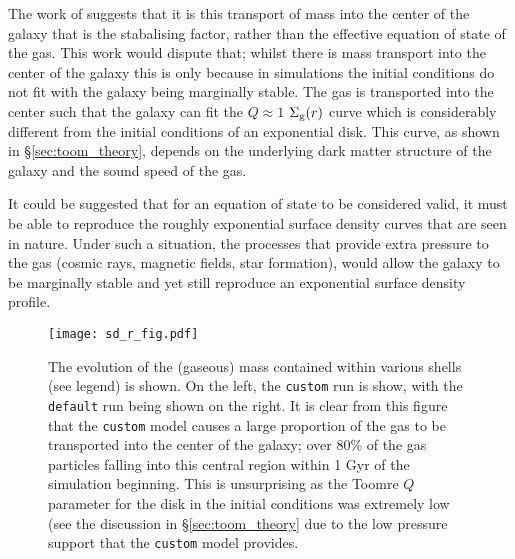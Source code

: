 The work of \citet{krumholz_is_2016} suggests that it is this transport of mass into the center of the galaxy that is the stabalising factor, rather than the effective equation of state of the gas.
This work would dispute that; whilst there is mass transport into the center of the galaxy this is only because in simulations the initial conditions do not fit with the galaxy being marginally stable.
The gas is transported into the center such that the galaxy can fit the $Q\approx1$ $\Sigma_\mathrm{g}(r)$ curve which is considerably different from the initial conditions of an exponential disk.
This curve, as shown in \S \ref{sec:toom_theory}, depends on the underlying dark matter structure of the galaxy and the sound speed of the gas.

It could be suggested that for an equation of state to be considered valid, it must be able to reproduce the roughly exponential surface density curves that are seen in nature.
Under such a situation, the processes that provide extra pressure to the gas (cosmic rays, magnetic fields, star formation), would allow the galaxy to be marginally stable and yet still reproduce an exponential surface density profile.

\begin{figure}[!ht]
    \centering
    \texttt{[image: sd\_r\_fig.pdf]}
    \caption{The evolution of the (gaseous) mass contained within various shells (see legend) is shown. On the left, the {\tt custom} run is show, with the {\tt default} run being shown on the right. It is clear from this figure that the {\tt custom} model causes a large proportion of the gas to be transported into the center of the galaxy; over 80\% of the gas particles falling into this central region within 1 Gyr of the simulation beginning. This is unsurprising as the Toomre $Q$ parameter for the disk in the initial conditions was extremely low (see the discussion in \S \ref{sec:toom_theory} due to the low pressure support that the {\tt custom} model provides.}
    \label{fig:sd_r_evo}
\end{figure}

